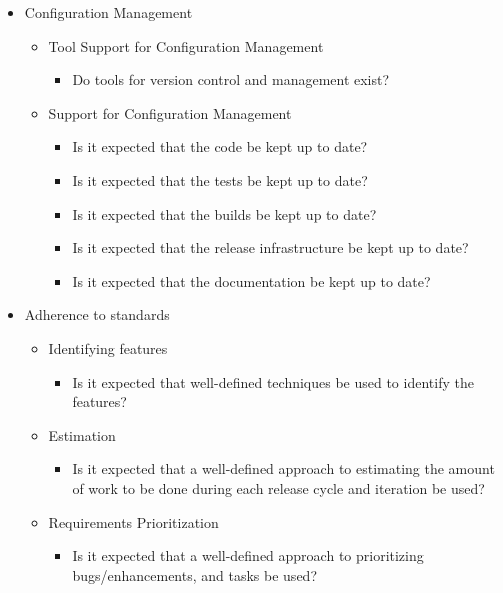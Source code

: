 \begin{appendices}
\begin{itemize}
\begin{itemize}
\begin{itemize}
				\end{itemize}
		\end{itemize}
	\item Configuration Management
		\begin{itemize}
			\item Tool Support for Configuration Management
				\begin{itemize}
					\item Do tools for version control and management exist?
				\end{itemize}
			\item Support for Configuration Management
				\begin{itemize}
					\item Is it expected that the code be kept up to date?
					\item Is it expected that the tests be kept up to date?
					\item Is it expected that the builds be kept up to date?
					\item Is it expected that the release infrastructure be kept up to date?
					\item Is it expected that the documentation be kept up to date?
				\end{itemize}
		\end{itemize}
	\item Adherence to standards
		\begin{itemize}
			\item Identifying features
				\begin{itemize}
					\item Is it expected that well-defined techniques be used to identify the features?
					\end{itemize}
			\item Estimation
				\begin{itemize}
					\item Is it expected that a well-defined approach to estimating the amount of work to be done during each release cycle and iteration be used?
				\end{itemize}
			\item Requirements Prioritization
				\begin{itemize}
					\item Is it expected that a well-defined approach to prioritizing bugs/enhancements, and tasks be used?
				\end{itemize}	

\end{itemize}
\end{itemize}
\end{appendices}
